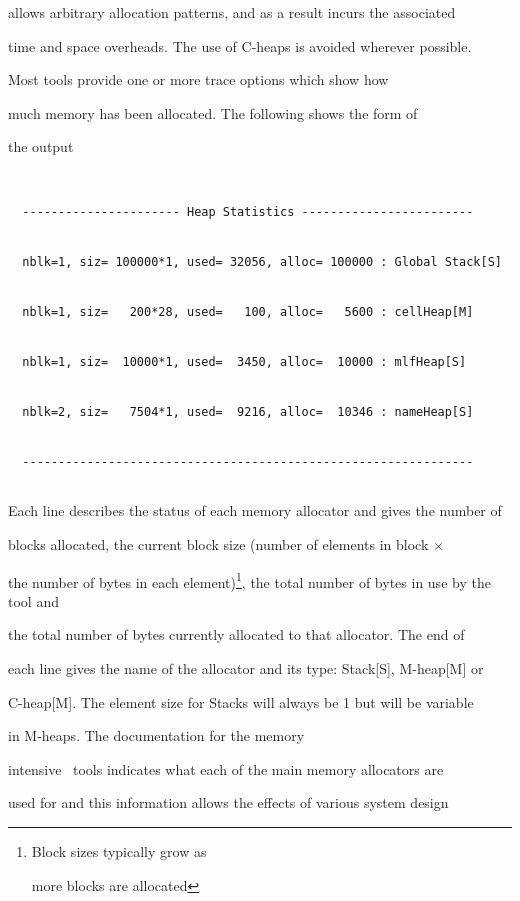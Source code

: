 allows arbitrary allocation patterns, and as a result incurs the associated


time and space overheads.  The use of C-heaps is avoided wherever possible.





Most tools provide one or more trace options which show how


much memory has been allocated.  The following shows the form of


the output


\begin{verbatim}


  ---------------------- Heap Statistics ------------------------


  nblk=1, siz= 100000*1, used= 32056, alloc= 100000 : Global Stack[S]


  nblk=1, siz=   200*28, used=   100, alloc=   5600 : cellHeap[M]


  nblk=1, siz=  10000*1, used=  3450, alloc=  10000 : mlfHeap[S]


  nblk=2, siz=   7504*1, used=  9216, alloc=  10346 : nameHeap[S]


  ---------------------------------------------------------------


\end{verbatim}


Each line describes the status of each memory allocator and gives the number of


blocks allocated, the current block size (number of elements in block $\times$


the number of bytes in each element)\footnote{ Block sizes typically grow as


more blocks are allocated}, the total number of bytes in use by the tool and


the total number of bytes currently allocated to that allocator.  The end of


each line gives the name of the allocator and its type: Stack[S], M-heap[M] or


C-heap[M].  The element size for Stacks will always be 1 but will be variable


in M-heaps. The documentation for the memory


intensive \HTK\ tools indicates what each of the main memory allocators are


used for and this information allows the effects of various system design


